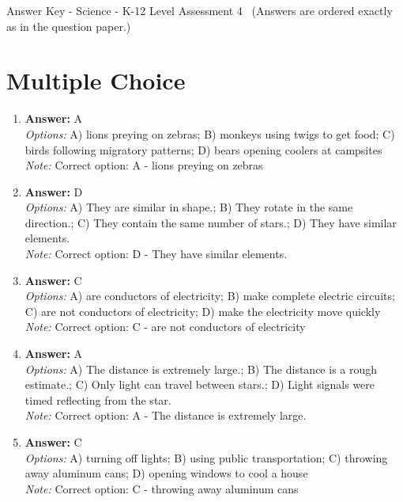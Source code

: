 \documentclass[12pt]{article}
\begin{document}
\begin{center}
Answer Key - Science - K-12 Level Assessment 4 \
\small (Answers are ordered exactly as in the question paper.)
\end{center}

\section*{Multiple Choice}
\begin{enumerate}[label=\arabic*.]
\item \textbf{Answer:} A
\\ \textit{Options:} A) lions preying on zebras; B) monkeys using twigs to get food; C) birds following migratory patterns; D) bears opening coolers at campsites
\\ \textit{Note:} Correct option: A - lions preying on zebras
\item \textbf{Answer:} D
\\ \textit{Options:} A) They are similar in shape.; B) They rotate in the same direction.; C) They contain the same number of stars.; D) They have similar elements.
\\ \textit{Note:} Correct option: D - They have similar elements.
\item \textbf{Answer:} C
\\ \textit{Options:} A) are conductors of electricity; B) make complete electric circuits; C) are not conductors of electricity; D) make the electricity move quickly
\\ \textit{Note:} Correct option: C - are not conductors of electricity
\item \textbf{Answer:} A
\\ \textit{Options:} A) The distance is extremely large.; B) The distance is a rough estimate.; C) Only light can travel between stars.; D) Light signals were timed reflecting from the star.
\\ \textit{Note:} Correct option: A - The distance is extremely large.
\item \textbf{Answer:} C
\\ \textit{Options:} A) turning off lights; B) using public transportation; C) throwing away aluminum cans; D) opening windows to cool a house
\\ \textit{Note:} Correct option: C - throwing away aluminum cans
\end{enumerate}
\end{document}

